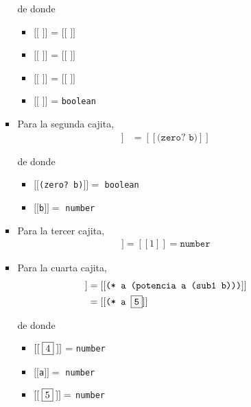 \documentclass[letterpaper,11pt]{article}
\begin{document}
\begin{enumerate}
\begin{enumerate}
\begin{itemize}
            de donde 
            \begin{itemize}
                \item $[[$  $]]$ = $[[$  $]]$
                \item $[[$  $]]$ = $[[$  $]]$
                \item $[[$  $]]$ = $[[$ $]]$ 
                \item $[[$  $]]$ = \texttt{boolean}
            \end{itemize}
            
            \item Para la segunda cajita, 
            \begin{align*}
                [[ \; \fbox{2} \; ]]
                &= [[\texttt{(zero? b)}]]
            \end{align*}
            
            de donde 
            \begin{itemize}
                \item $[[$\texttt{(zero? b)}$]] =$ \texttt{boolean}
                \item $[[$\texttt{b}$]] =$ \texttt{number}
            \end{itemize}
            
            \item Para la tercer cajita, 
            \begin{align*}
                [[ \; \fbox{3} \; ]] = [[1]] = \texttt{number}
            \end{align*}
            
            \item Para la cuarta cajita, 
            \begin{align*}
                [[\; \fbox{4} \;]]
                &= [[\texttt{(* a (potencia a (sub1 b)))}]] \\
                &= [[\texttt{(* a \fbox{5}}]]
            \end{align*}
            
            de donde 
            \begin{itemize}
                \item $[[\; \fbox{4}\;]]$ = \texttt{number}
                \item $[[$\texttt{a}$]] = $ \texttt{number}
                \item $[[\; \fbox{5} \;]] =$ \texttt{number}
            \end{itemize}
            

\end{itemize}
\end{enumerate}
\end{enumerate}
\end{document}
